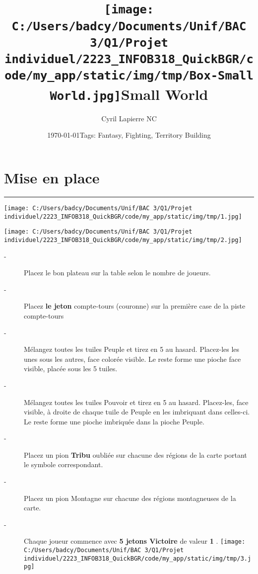 \documentclass{scrartcl}%
\title{\texttt{[image: C:/Users/badcy/Documents/Unif/BAC 3/Q1/Projet individuel/2223\_INFOB318\_QuickBGR/code/my\_app/static/img/tmp/Box-Small World.jpg]}\break Small World }%
\author{Cyril Lapierre NC}%
\date{\today \break Tags: Fantasy, Fighting, Territory Building}%
\begin{document}
%
\normalsize%
\maketitle\thispagestyle{header}%
\pagestyle{header}%
\section{ Mise en place
}%
\label{sec:Miseenplace}%
\rule{18cm}{0.07cm}\break%
%
\begin{center}\texttt{[image: C:/Users/badcy/Documents/Unif/BAC 3/Q1/Projet individuel/2223\_INFOB318\_QuickBGR/code/my\_app/static/img/tmp/1.jpg]}\end{center}%
%
\begin{center}\texttt{[image: C:/Users/badcy/Documents/Unif/BAC 3/Q1/Projet individuel/2223\_INFOB318\_QuickBGR/code/my\_app/static/img/tmp/2.jpg]}\end{center}%

%
\begin{description}%
\item[{-} ]%
%
 Placez le bon plateau sur la table selon le nombre de joueurs. 
%
\item[{-} ]%
%
 Placez %
\textbf{le jeton}%
\textit{ }%
 compte{-}tours (couronne) sur la première case de la piste compte{-}tours
%
\item[{-} ]%
%
 Mélangez toutes les tuiles Peuple et tirez en 5 au hasard. Placez{-}les les unes sous les autres, face colorée visible. Le reste forme une pioche face visible, placée sous les 5 tuiles.
%
\item[{-} ]%
%
 Mélangez toutes les tuiles Pouvoir et tirez en 5 au hasard. Placez{-}les, face visible, à droite de chaque tuile de Peuple en les imbriquant dans celles{-}ci. Le reste forme une pioche imbriquée dans la pioche Peuple.
%
\item[{-} ]%
%
 Placez un pion %
\textbf{Tribu}%
\textit{ }%
 oubliée sur chacune des régions de la carte portant le symbole correspondant.
%
\item[{-} ]%
%
 Placez un pion Montagne sur chacune des régions montagneuses de la carte.
%
\item[{-} ]%
%
 Chaque joueur commence avec %
\textbf{5 jetons Victoire}%
\textit{ }%
 de valeur %
\textbf{1}%
.%
\texttt{[image: C:/Users/badcy/Documents/Unif/BAC 3/Q1/Projet individuel/2223\_INFOB318\_QuickBGR/code/my\_app/static/img/tmp/3.jpg]}%

%
\end{description}
\end{document}
